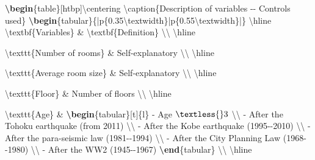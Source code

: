\documentclass[
  letterpaper,
  DIV=11,
  numbers=noendperiod]{scrartcl}
\newenvironment{Shaded}{\begin{snugshade}}{\end{snugshade}}
\newcommand{\ExtensionTok}[1]{\textcolor[rgb]{0.00,0.23,0.31}{#1}}
\newcommand{\FunctionTok}[1]{\textcolor[rgb]{0.28,0.35,0.67}{#1}}
\newcommand{\KeywordTok}[1]{\textcolor[rgb]{0.00,0.23,0.31}{\textbf{#1}}}
\newcommand{\NormalTok}[1]{\textcolor[rgb]{0.00,0.23,0.31}{#1}}
\newcommand{\OperatorTok}[1]{\textcolor[rgb]{0.37,0.37,0.37}{#1}}
\newcommand{\SpecialStringTok}[1]{\textcolor[rgb]{0.13,0.47,0.30}{#1}}
\begin{document}
\begin{Shaded}
\begin{Highlighting}[]
\KeywordTok{\textbackslash{}begin}\NormalTok{\{}\ExtensionTok{table}\NormalTok{\}[htbp]}\FunctionTok{\textbackslash{}centering}
\FunctionTok{\textbackslash{}caption}\NormalTok{\{Description of variables {-}{-} Controls used\}}
\KeywordTok{\textbackslash{}begin}\NormalTok{\{}\ExtensionTok{tabular}\NormalTok{\}\{|p\{0.35}\FunctionTok{\textbackslash{}textwidth}\NormalTok{\}|p\{0.55}\FunctionTok{\textbackslash{}textwidth}\NormalTok{\}|\}}
\FunctionTok{\textbackslash{}hline}
\FunctionTok{\textbackslash{}textbf}\NormalTok{\{Variables\} }\OperatorTok{\&} \FunctionTok{\textbackslash{}textbf}\NormalTok{\{Definition\} }\FunctionTok{\textbackslash{}\textbackslash{}}
\FunctionTok{\textbackslash{}hline}

\FunctionTok{\textbackslash{}texttt}\NormalTok{\{Number of rooms\} }\OperatorTok{\&}\NormalTok{ Self{-}explanatory }\FunctionTok{\textbackslash{}\textbackslash{}}
\FunctionTok{\textbackslash{}hline}

\FunctionTok{\textbackslash{}texttt}\NormalTok{\{Average room size\} }\OperatorTok{\&}\NormalTok{ Self{-}explanatory }\FunctionTok{\textbackslash{}\textbackslash{}}
\FunctionTok{\textbackslash{}hline}

\FunctionTok{\textbackslash{}texttt}\NormalTok{\{Floor\} }\OperatorTok{\&}\NormalTok{ Number of floors }\FunctionTok{\textbackslash{}\textbackslash{}}
\FunctionTok{\textbackslash{}hline}

\FunctionTok{\textbackslash{}texttt}\NormalTok{\{Age\} }\OperatorTok{\&} 
\KeywordTok{\textbackslash{}begin}\NormalTok{\{}\ExtensionTok{tabular}\NormalTok{\}[t]\{l\}}
\NormalTok{{-} Age }\SpecialStringTok{$\textless{} 3$} \FunctionTok{\textbackslash{}\textbackslash{}}
\NormalTok{{-} After the Tohoku earthquake (from 2011) }\FunctionTok{\textbackslash{}\textbackslash{}}
\NormalTok{{-} After the Kobe earthquake (1995{-}{-}2010) }\FunctionTok{\textbackslash{}\textbackslash{}}
\NormalTok{{-} After the para{-}seismic law (1981{-}{-}1994) }\FunctionTok{\textbackslash{}\textbackslash{}}
\NormalTok{{-} After the City Planning Law (1968{-}{-}1980) }\FunctionTok{\textbackslash{}\textbackslash{}}
\NormalTok{{-} After the WW2 (1945{-}{-}1967)}
\KeywordTok{\textbackslash{}end}\NormalTok{\{}\ExtensionTok{tabular}\NormalTok{\}}
\FunctionTok{\textbackslash{}\textbackslash{}}
\FunctionTok{\textbackslash{}hline}


\end{Highlighting}
\end{Shaded}
\end{document}
